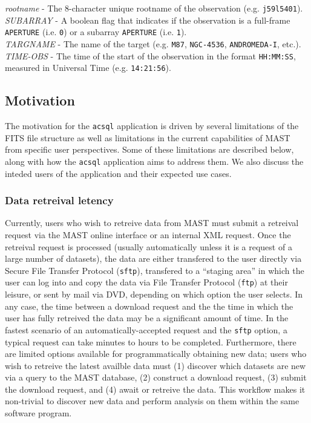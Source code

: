 \documentclass[10pt,journal,compsoc]{IEEEtran}
\begin{document}
\textit{rootname} - The 8-character unique rootname of the observation (e.g. \texttt{j59l5401}).\\

\textit{SUBARRAY} - A boolean flag that indicates if the observation is a full-frame \texttt{APERTURE} (i.e. \texttt{0}) or a subarray \texttt{APERTURE} (i.e. \texttt{1}).\\

\textit{TARGNAME} - The name of the target (e.g. \texttt{M87}, \texttt{NGC-4536}, \texttt{ANDROMEDA-I}, etc.).\\

\textit{TIME-OBS} - The time of the start of the observation in the format \texttt{HH:MM:SS}, measured in Universal Time (e.g. \texttt{14:21:56}).\\


\subsection{Motivation} \label{sec1.3}

The motivation for the \texttt{acsql} application is driven by several limitations of the FITS file structure as well as limitations in the current capabilities of
MAST from specific user perspectives. Some of these limitations are described below, along with how the \texttt{acsql} application aims to address them.  We also
discuss the inteded users of the application and their expected use cases.


\subsubsection{Data retreival letency} \label{sec1.3.1}

Currently, users who wish to retreive data from MAST must submit a retreival request via the MAST online interface or an internal XML request. Once the retreival
request is processed (usually automatically unless it is a request of a large number of datasets), the data are either transfered to the user directly via
Secure File Transfer Protocol (\texttt{sftp}), transfered to a ``staging area'' in which the user can log into and copy the data via File Transfer Protocol (\texttt{ftp})
at their leisure, or sent by mail via DVD, depending on which option the user selects.  In any case, the time between a download request and the the time in which the
user has fully retreived the data may be a significant amount of time.  In the fastest scenario of an automatically-accepted request and the \texttt{sftp} option, a
typical request can take minutes to hours to be completed. Furthermore, there are limited options available for programmatically obtaining new data; users who wish to
retreive the latest availble data must (1) discover which datasets are new via a query to the MAST database, (2) construct a download request, (3) submit the download
request, and (4) await or retreive the data.  This workflow makes it non-trivial to discover new data and perform analysis on them within the same software program.
\end{document}
